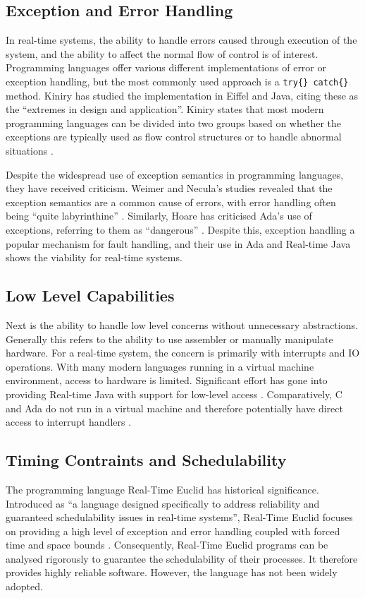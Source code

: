 \subsection{Exception and Error Handling} %
In real-time systems, the ability to handle errors caused through execution of
the system, and the ability to affect the normal flow of control is of
interest. Programming languages offer various different implementations of
error or exception handling, but the most commonly used approach is a 
\texttt{try\{\} catch\{\} } method. Kiniry has studied the implementation in 
Eiffel and Java, citing these as the ``extremes in design and application''. 
Kiniry states that most modern programming languages can be divided into two
groups based on whether the exceptions are typically used as flow control
structures or to handle abnormal situations
\cite{Kiniry:2006:EJE:2124243.2124264}. 
\par\bigskip\noindent
Despite the widespread use of exception semantics in programming languages,
they have received criticism. Weimer and Necula's studies revealed
that the exception semantics are a common cause of errors, with error handling
often being ``quite labyrinthine'' \cite{Weimer:2008:ESP:1330017.1330019}. 
Similarly, Hoare has criticised Ada's use of exceptions, referring to them as
``dangerous'' \cite{Hoare:1981:EOC:358549.358561}. Despite this,
exception handling a popular mechanism for fault handling, and their
use in Ada and Real-time Java shows the viability for real-time systems.

\subsection{Low Level Capabilities} %
Next is the ability to handle low level concerns without unnecessary abstractions. 
Generally this refers to the ability to use assembler or manually manipulate hardware. For a real-time
system, the concern is primarily with interrupts and IO operations. With many
modern languages running in a virtual machine environment, access to hardware
is limited. Significant effort has gone into providing
Real-time Java with support for low-level access \cite{4519616,real-java}. 
Comparatively, C and Ada do not run in a virtual machine and therefore
potentially have direct access to interrupt handlers \cite{real-time-systems}.

\subsection{Timing Contraints and Schedulability} 
The programming language Real-Time Euclid has historical 
significance. Introduced as ``a language designed specifically to address reliability 
and guaranteed schedulability issues in real-time systems'', Real-Time Euclid 
focuses on providing a high level of exception and error handling coupled with 
forced time and space bounds \cite{real-time-euclid}. Consequently, Real-Time Euclid 
programs can be analysed rigorously to guarantee the schedulability of their 
processes. It therefore provides highly reliable software. 
However, the language has not been widely adopted.

